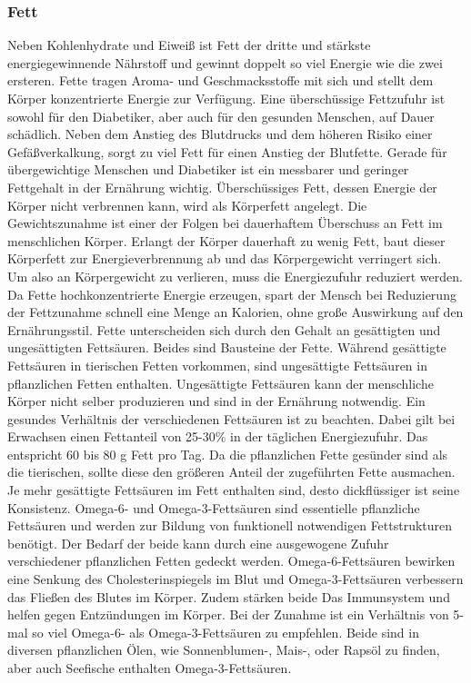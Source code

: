 \documentclass[a4paper,11pt]{article}%
\renewcommand{\\}{\vspace*{0.5\baselineskip} \newline}
\begin{document}
	\subsubsection{Fett}
		Neben Kohlenhydrate und Eiweiß ist Fett der dritte und stärkste energiegewinnende Nährstoff und gewinnt doppelt so viel Energie wie die zwei ersteren. Fette tragen Aroma- und Geschmacksstoffe mit sich und stellt dem Körper konzentrierte Energie zur Verfügung. Eine überschüssige Fettzufuhr ist sowohl für den Diabetiker, aber auch für den gesunden Menschen, auf Dauer schädlich. Neben dem Anstieg des Blutdrucks und dem höheren Risiko einer Gefäßverkalkung, sorgt zu viel Fett für einen Anstieg der Blutfette. Gerade für übergewichtige Menschen und Diabetiker ist ein messbarer und geringer Fettgehalt in der Ernährung wichtig.\cite{SG} Überschüssiges Fett, dessen Energie der Körper nicht verbrennen kann, wird als Körperfett angelegt. Die Gewichtszunahme ist einer der Folgen bei dauerhaftem Überschuss an Fett im menschlichen Körper. Erlangt der Körper dauerhaft zu wenig Fett, baut dieser Körperfett zur Energieverbrennung ab und das Körpergewicht verringert sich.\cite{ND} Um also an Körpergewicht zu verlieren, muss die Energiezufuhr reduziert werden. Da Fette hochkonzentrierte Energie erzeugen, spart der Mensch bei Reduzierung der Fettzunahme schnell eine Menge an Kalorien, ohne große Auswirkung auf den Ernährungsstil.\cite{SG}\newline
		Fette unterscheiden sich durch den Gehalt an gesättigten und ungesättigten Fettsäuren. Beides sind Bausteine der Fette. Während gesättigte Fettsäuren in tierischen Fetten vorkommen, sind ungesättigte Fettsäuren in pflanzlichen Fetten enthalten. Ungesättigte Fettsäuren kann der menschliche Körper nicht selber produzieren und sind in der Ernährung notwendig. Ein gesundes Verhältnis der verschiedenen Fettsäuren ist zu beachten. Dabei gilt bei Erwachsen einen Fettanteil von 25-30\% in der täglichen Energiezufuhr. Das entspricht 60 bis 80 g Fett pro Tag. Da die pflanzlichen Fette gesünder sind als die tierischen, sollte diese den größeren Anteil der zugeführten Fette ausmachen. Je mehr gesättigte Fettsäuren im Fett enthalten sind, desto dickflüssiger ist seine Konsistenz. \newline
		Omega-6- und Omega-3-Fettsäuren sind essentielle pflanzliche Fettsäuren und werden zur Bildung von funktionell notwendigen Fettstrukturen benötigt. Der Bedarf der beide kann durch eine ausgewogene Zufuhr verschiedener pflanzlichen Fetten gedeckt werden. Omega-6-Fettsäuren bewirken eine Senkung des Cholesterinspiegels im Blut und Omega-3-Fettsäuren verbessern das Fließen des Blutes im Körper. Zudem stärken beide Das Immunsystem und helfen gegen Entzündungen im Körper. Bei der Zunahme ist ein Verhältnis von 5-mal so viel Omega-6- als Omega-3-Fettsäuren zu empfehlen. Beide sind in diversen pflanzlichen Ölen, wie Sonnenblumen-, Mais-, oder Rapsöl zu finden, aber auch Seefische enthalten Omega-3-Fettsäuren.\cite{ND}\newline
\end{document}
